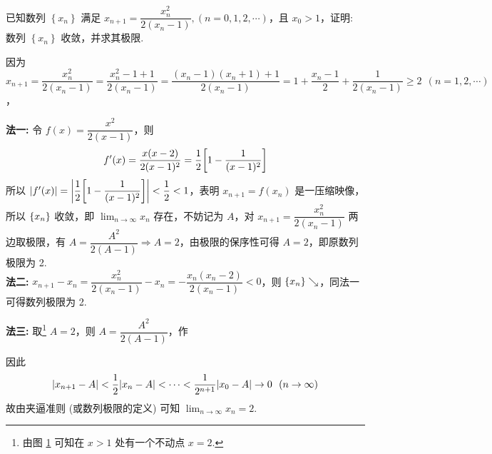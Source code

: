 \begin{example}
    已知数列 $ \left\{x_{n}\right\} $ 满足 $ x_{n+1}=\dfrac{x_{n}^{2}}{2\left(x_{n}-1\right)},(n=0,1,2, \cdots)  $，且 $ x_{0}>1$，证明: 数列 $ \left\{x_{n}\right\} $ 收敛，并求其极限.
\end{example}
\begin{solution}
    因为 $x_{n+1}=\dfrac{x_n^2}{2(x_n-1)}=\dfrac{x_n^2-1+1}{2(x_n-1)}=\dfrac{(x_n-1)(x_n+1)+1}{2(x_n-1)}=1+\dfrac{x_n-1}{2}+\dfrac{1}{2(x_n-1)}\geqslant 2~~(n=1,2,\cdots)$，\\
    \begin{minipage}{0.29\linewidth}
        \begin{figure}[H]
            \centering
            \caption{}
            \label{bddxn2xn1}
        \end{figure}
    \end{minipage}\hfill
    \begin{minipage}{0.7\linewidth}
        \textbf{法一: }令 $f(x)=\dfrac{x^2}{2(x-1)}$，则
        $$f'(x)=\dfrac{x(x-2)}{2(x-1)^2}=\dfrac{1}{2}\qty[1-\dfrac{1}{(x-1)^2}]$$
        所以 $|f'(x)|=\qty|\dfrac{1}{2}\qty[1-\dfrac{1}{(x-1)^2}]|<\dfrac{1}{2}<1$，表明 $x_{n+1}=f(x_n)$ 是一压缩映像，所以 $\qty{x_n}$ 收敛，即 $\displaystyle\lim_{n\to\infty}x_n$ 存在，不妨记为 $A$，对 $x_{n+1}=\dfrac{x_n^2}{2(x_n-1)} $ 两边取极限，有
        $A=\dfrac{A^2}{2(A-1)}\Rightarrow A=2$，由极限的保序性可得 $A=2$，即原数列极限为 2.\\
        \textbf{法二: }$x_{n+1}-x_n=\dfrac{x_n^2}{2(x_n-1)}-x_n=-\dfrac{x_n(x_n-2)}{2(x_n-1)}<0$，则 $\qty{x_n}\searrow$，同法一可得数列极限为 2.
    \end{minipage}
    \textbf{法三: }取\footnote{由图 \ref{bddxn2xn1} 可知在 $x>1$ 处有一个不动点 $x=2$.} $A=2$，则 $A=\dfrac{A^2}{2(A-1)}$，作 
    因此 $$\qty|x_{n+1}-A|<\dfrac{1}{2}\qty|x_n-A|<\cdots<\dfrac{1}{2^{n+1}}\qty|x_0-A|\to 0~~(n\to\infty)$$
    故由夹逼准则 (或数列极限的定义) 可知 $\displaystyle\lim_{n\to\infty}x_n=2.$
\end{solution}

